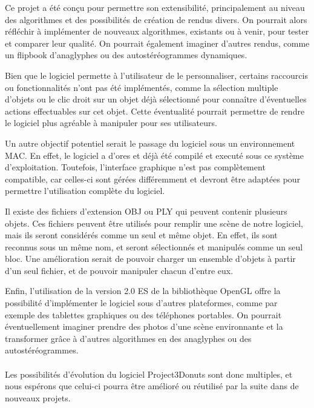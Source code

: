 Ce projet a été conçu pour permettre son extensibilité, principalement au niveau des algorithmes et des possibilités de création de rendus divers. On pourrait alors réfléchir à implémenter de nouveaux algorithmes, existants ou à venir, pour tester et comparer leur qualité. On pourrait également imaginer d'autres rendus, comme un flipbook d'anaglyphes ou des autostéréogrammes dynamiques.

Bien que le logiciel permette à l'utilisateur de le personnaliser, certains raccourcis ou fonctionnalités n'ont pas été implémentés, comme la sélection multiple d'objets ou le clic droit sur un objet déjà sélectionné pour connaître d'éventuelles actions effectuables sur cet objet. Cette éventualité pourrait permettre de rendre le logiciel plus agréable à manipuler pour ses utilisateurs.

Un autre objectif potentiel serait le passage du logiciel sous un environnement MAC. En effet, le logiciel a d'ores et déjà été compilé et executé sous ce système d'exploitation. Toutefois, l'interface graphique n'est pas complètement compatible, car celles-ci sont gérées différemment et devront être adaptées pour permettre l'utilisation complète du logiciel.

Il existe des fichiers d'extension OBJ ou PLY qui peuvent contenir plusieurs objets. Ces fichiers peuvent être utilisés pour remplir une scène de notre logiciel, mais ils seront considérés comme un seul et même objet. En effet, ils sont reconnus sous un même nom, et seront sélectionnés et manipulés comme un seul bloc. Une amélioration serait de pouvoir charger un ensemble d'objets à partir d'un seul fichier, et de pouvoir manipuler chacun d'entre eux.

Enfin, l'utilisation de la version 2.0 ES de la bibliothèque OpenGL offre la possibilité d'implémenter le logiciel sous d'autres plateformes, comme par exemple des tablettes graphiques ou des téléphones portables. On pourrait éventuellement imaginer prendre des photos d'une scène environnante et la transformer grâce à d'autres algorithmes en des anaglyphes ou des autostéréogrammes. 

\paragraph{}
Les possibilités d'évolution du logiciel Project3Donuts sont donc multiples, et nous espérons que celui-ci pourra être amélioré ou réutilisé par la suite dans de nouveaux projets.
